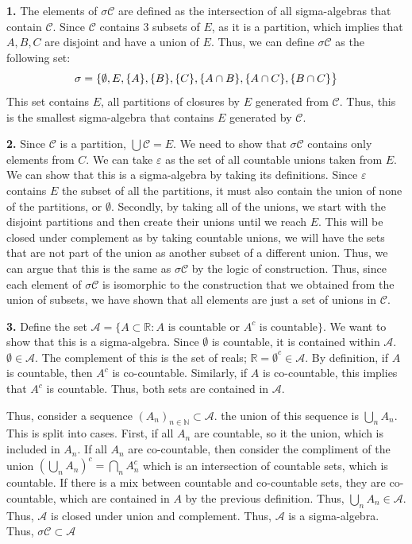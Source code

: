 \begin{solution}
	
	\textbf{1.} The elements of $\sigma \mathcal{C}$ are defined as the intersection of all sigma-algebras that contain $\mathcal{C}$. Since $\mathcal{C}$ contains 3 subsets of $E$, as it is a partition, which implies that $A,B,C$ are disjoint and have a union of $E$. Thus, we can define $\sigma \mathcal{C}$ as the following set:
	\begin{equation}
		\sigma \mathcal{\mathcal} = \{\emptyset, E, \{A\}, \{B\}, \{C\}, \{A\cap B\}, \{A\cap C\}, \{B\cap C\}\big\}
	\end{equation}
	This set contains $E$, all partitions of closures by $E$ generated from $\mathcal{C}$. Thus, this is the smallest sigma-algebra that contains $E$ generated by $\mathcal{C}$.
	
	\textbf{2.} Since $\mathcal{C}$ is a partition,  $\bigcup \mathcal{C} = E$. We need to show that $\sigma \mathcal{C}$ contains only elements from $C$. We can take $\varepsilon$ as the set of all countable unions taken from $E$. We can show that this is a sigma-algebra by taking its definitions. Since $\varepsilon$ contains $E$ the subset of all the partitions, it must also contain the union of none of the partitions, or $\emptyset$. Secondly, by taking all of the unions, we start with the disjoint partitions and then create their unions until we reach $E$. This will be closed under complement as by taking countable unions, we will have the sets that are not part of the union as another subset of a different union. Thus, we can argue that this is the same as $\sigma \mathcal{C}$ by the logic of construction. Thus, since each element of  $\sigma \mathcal{C}$ is isomorphic to the construction that we obtained from the union of subsets, we have shown that all elements are just a set of unions in $\mathcal{C}$.
	
	\textbf{3.} Define the set $\mathcal{A} = \{ A \subset \mathbb{R} : A \text{ is countable or } A^c \text{ is countable}\}$. We want to show that this is a sigma-algebra. Since $\emptyset$ is countable, it is contained within $\mathcal{A}$. $\emptyset \in \mathcal{A}$. The complement of this is the set of reals; $\mathbb{R} = \emptyset^c \in \mathcal{A}$. By definition, if $A$ is countable, then $A^c$ is co-countable. Similarly, if $A$ is co-countable, this implies that $A^c$ is countable. Thus, both sets are contained in $\mathcal{A}$. 
	
	Thus, consider a sequence $(A_n)_{n\in\mathbb{N}} \subset \mathcal{A}$. the union of this sequence is $\bigcup_n A_n$. This is split into cases. First, if all $A_n$ are countable, so it the union, which is included in $A_n$. If all $A_n$ are co-countable, then consider the compliment of the union $(\bigcup_n A_n)^c = \bigcap_n A_n^c$ which is an intersection of countable sets, which is countable. If there is a mix between countable and co-countable sets, they are co-countable, which are contained in $A$ by the previous definition. Thus, $\bigcup_n A_n \in \mathcal{A}$. Thus, $\mathcal{A}$ is closed under union and complement. Thus, $\mathcal{A}$ is a sigma-algebra. Thus, $\sigma \mathcal{C} \subset \mathcal{A}$
	

\end{solution}
